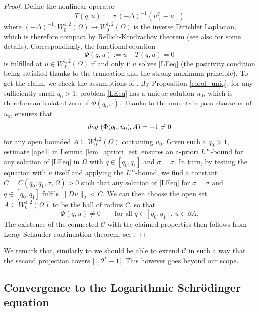 \documentclass[12pt]{amsart}
\numberwithin{equation}{section}
\theoremstyle{plain}
\theoremstyle{plain}
\theoremstyle{plain}
\theoremstyle{definition}
\begin{document}
\begin{proof}
 Define the nonlinear operator 
\[
T(q, u):=\bar\sigma\, (-\Delta)^{-1}\left(u_+^q-u_+\right)
\]
where $(-\Delta)^{-1}: W^{1,2}_0(\Omega)\to W^{1,2}_0(\Omega)$ is the inverse Dirichlet Laplacian, which is therefore compact by Rellich-Kondrachov theorem (see also \cite[Lemma 7.1]{JZZ24} for some details). 
Correspondingly, the functional equation
\[
\Phi(q, u):=u-T(q, u)=0
\]
is fulfilled at $u\in W^{1, 2}_0(\Omega)$ if and only if $u$ solves \eqref{LEeq} (the positivity condition being satisfied thanks to the truncation and the strong maximum principle). 
To get the claim, we check the assumptions of \cite[Theorem 4.3.4]{AmAr11}. By Proposition \ref{corol_uniq}, 
for any sufficiently small $q_0>1$, problem \eqref{LEeq} has a unique solution $u_0$, which is therefore an isolated zero of $\Phi(q_0, \cdot)$. 
Thanks to the mountain pass character of $u_0$, \cite[Theorem 2 and pp. 310-311]{Hof84} ensures that 
\[
{\rm deg}\, \left(\Phi(q_0, u_0), A\right)=-1 \neq 0
\]
for any open bounded $A\subseteq W^{1, 2}_0(\Omega)$ containing $u_0$.
Given such a $q_0>1$, estimate \eqref{ape1} in Lemma \ref{lem_apriori_est} ensures an a-priori $L^\infty$-bound for any solution of \eqref{LEeq} in $\Omega$ with $q\in [q_0, q_1]$ and $\sigma=\bar\sigma$. In turn, by testing the equation with $u$ itself and applying the $L^\infty$-bound, we find a constant $C=C(q_0, q_1, \bar\sigma, \Omega)>0$ such that any solution of \eqref{LEeq} for $\sigma=\bar\sigma$ and $q\in [q_0, q_1]$ fulfils $\|Du\|_2< C$.
We can then choose the open set $A\subseteq W^{1,2}_0(\Omega)$ to be the ball of radius $C$, so that 
\[
\Phi(q, u)\neq 0 \qquad \text{for all $q\in [q_0, q_1]$, $u\in \partial A$}.
\]
The existence of the connected ${\mathcal C}$ with the claimed properties then follows from Leray-Schauder continuation theorem, see \cite[Theorem 4.3.4]{AmAr11}. 
\end{proof}

We remark that, similarly to \cite[Lemma 7.3]{JZZ24} we should be able to extend $\mathcal{C}$ in such a way that the second projection covers $]1, 2^*-1[$. This however goes beyond our scope. 


\subsection{Convergence to the Logarithmic Schr\"odinger equation}
 
\end{document}
